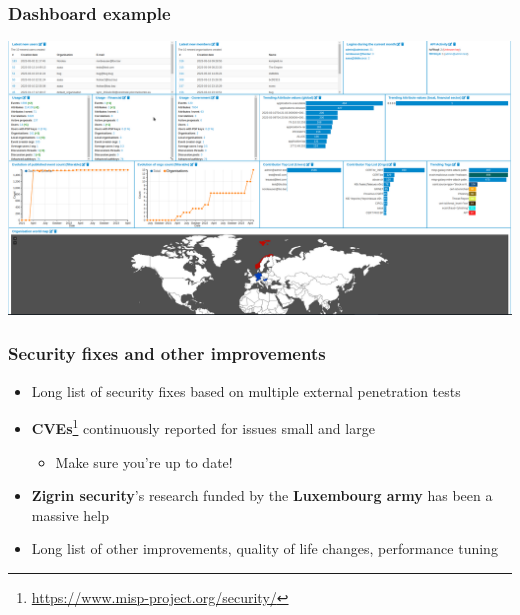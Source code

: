 \begin{frame}

\frametitle{Dashboard example}
\begin{center}
\includegraphics[scale=0.14]{images/dashboard_example.png}
\end{center}
\end{frame}

\begin{frame}
  \frametitle{Security fixes and other improvements}
  \begin{itemize}
     \item Long list of security fixes based on multiple external penetration tests
     \item {\bf CVEs}\footnote{\url{https://www.misp-project.org/security/}} continuously reported for issues small and large
     \begin{itemize}
         \item Make sure you're up to date!
     \end{itemize}
     \item {\bf Zigrin security}'s research funded by the {\bf Luxembourg army} has been a massive help
     \item Long list of other improvements, quality of life changes, performance tuning
  \end{itemize}
\end{frame}

